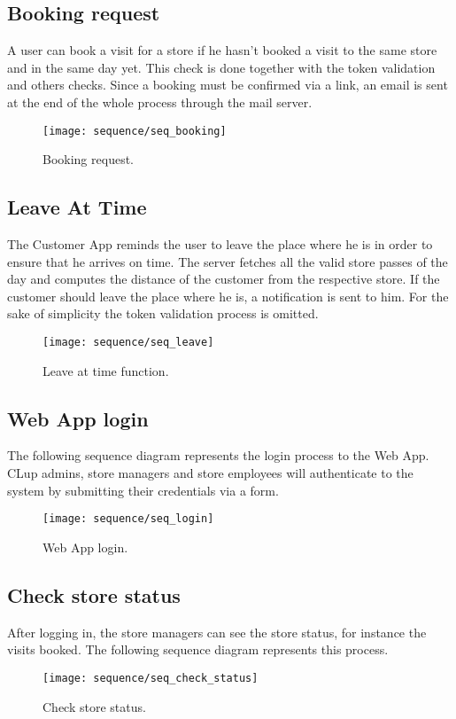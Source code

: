 \clearpage

\subsection{Booking request}
A user can book a visit for a store if he hasn't booked a visit to the same store and in the same day yet. This check is done together with the token validation and others checks.\newline
Since a booking must be confirmed via a link, an email is sent at the end of the whole process through the mail server.
\begin{figure}[H]
	\centering
	\texttt{[image: sequence/seq\_booking]}
	\caption{Booking request.}
	\label{fig:seq_booking}
\end{figure}

\clearpage
\subsection{Leave At Time}
The Customer App reminds the user to leave the place where he is in order to ensure that he arrives on time.\newline
The server fetches all the valid store passes of the day and computes the distance of the customer from the respective store. If the customer should leave the place where he is, a notification is sent to him. For the sake of simplicity the token validation process is omitted.
\begin{figure}[H]
	\centering
	\texttt{[image: sequence/seq\_leave]}
	\caption{Leave at time function.}
	\label{fig:seq_leave}
\end{figure}

\subsection{Web App login}
The following sequence diagram represents the login process to the Web App. CLup admins, store managers and store employees will authenticate to the system by submitting their credentials via a form.
\begin{figure}[H]
	\centering
	\texttt{[image: sequence/seq\_login]}
	\caption{Web App login.}
	\label{fig:seq_login}
\end{figure}

\clearpage

\subsection{Check store status}
After logging in, the store managers can see the store status, for instance the visits booked. The following sequence diagram represents this process. 
\begin{figure}[H]
	\centering
	\texttt{[image: sequence/seq\_check\_status]}
	\caption{Check store status.}
	\label{fig:seq_check_status}
\end{figure}

